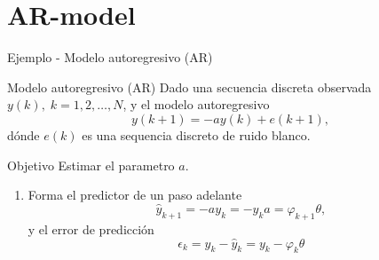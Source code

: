 \documentclass[presentation,aspectratio=169]{beamer}
\begin{document}
\section{AR-model}
\label{sec:org196edb3}

\begin{frame}[label={sec:orgef91a65}]{Ejemplo - Modelo autoregresivo (AR)}
\end{frame}
\begin{frame}[label={sec:org2aec516}]{Modelo autoregresivo (AR)}
Dado una secuencia discreta observada \(y(k), \; k=1,2,\ldots,N\), y el modelo autoregresivo
\[ y(k+1) = -ay(k) + e(k+1),\]
dónde \(e(k)\) es una sequencia discreto de ruido blanco.

\alert{Objetivo} Estimar el parametro \(a\).

\begin{enumerate}
\item Forma el predictor de un paso adelante \[\hat{y}_{k+1} = -ay_k=-y_ka = \varphi_{k+1} \theta,\] y el error de predicción \[\epsilon_k = y_k - \hat{y}_k = y_k - \varphi_k \theta\]
\end{enumerate}
\end{frame}
\end{document}
